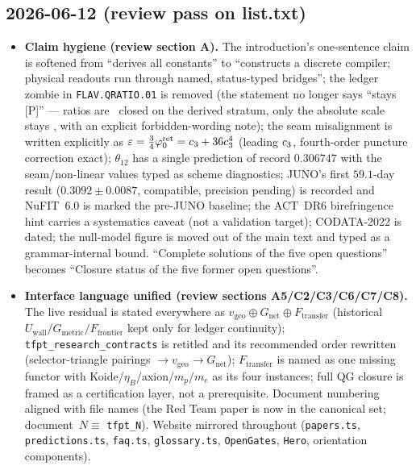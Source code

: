 \subsection*{2026-06-12 (review pass on list.txt)}
\begin{itemize}
\item \textbf{Claim hygiene (review section A).} The introduction's one-sentence claim is softened from
  ``derives all constants'' to ``constructs a discrete compiler; physical readouts run through named,
  status-typed bridges''; the ledger zombie in \texttt{FLAV.QRATIO.01} is removed (the statement no longer
  says ``stays [P]'' --- ratios are \mE\ closed on the derived stratum, only the absolute scale stays \mO,
  with an explicit forbidden-wording note); the seam misalignment is written explicitly as
  $\varepsilon=\tfrac34\varphi_0^{\mathrm{ret}}=c_3+36c_3^4$ (leading $c_3$, fourth-order puncture correction
  exact); $\theta_{12}$ has a single prediction of record $0.306747$ with the seam/non-linear values typed
  as scheme diagnostics; JUNO's first $59.1$-day result ($0.3092\pm0.0087$, compatible, precision pending)
  is recorded and NuFIT~6.0 is marked the pre-JUNO baseline; the ACT~DR6 birefringence hint carries a
  systematics caveat (not a validation target); CODATA-2022 is dated; the null-model figure is moved out
  of the main text and typed as a grammar-internal bound. ``Complete solutions of the five open
  questions'' becomes ``Closure status of the five former open questions''.
\item \textbf{Interface language unified (review sections A5/C2/C3/C6/C7/C8).} The live residual is stated
  everywhere as $v_{\mathrm{geo}}\oplus G_{\mathrm{net}}\oplus F_{\mathrm{transfer}}$ (historical
  $U_{\mathrm{wall}}/G_{\mathrm{metric}}/F_{\mathrm{frontier}}$ kept only for ledger continuity);
  \texttt{tfpt\_research\_contracts} is retitled and its recommended order rewritten (selector-triangle
  pairings $\to v_{\mathrm{geo}}\to G_{\mathrm{net}}$); $F_{\mathrm{transfer}}$ is named as one missing
  functor with Koide/$\eta_B$/axion/$m_p/m_e$ as its four instances; full QG closure is framed as a
  certification layer, not a prerequisite. Document numbering aligned with file names (the Red Team paper
  is now in the canonical set; document~$N\equiv$ \texttt{tfpt\_N}). Website mirrored throughout
  (\texttt{papers.ts}, \texttt{predictions.ts}, \texttt{faq.ts}, \texttt{glossary.ts}, \texttt{OpenGates},
  \texttt{Hero}, orientation components).
\end{itemize}

